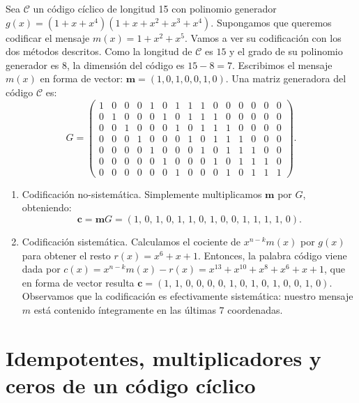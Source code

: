 \begin{example}
  Sea \(\mathcal C\) un código cíclico de longitud 15 con polinomio generador \(g(x) = (1 + x + x^4)(1 + x + x^2 + x^3 + x^4)\). Supongamos que queremos codificar el mensaje \(m(x) = 1 + x^2 + x^5\). Vamos a ver su codificación con los dos métodos descritos. Como la longitud de \(\mathcal C\) es \(15\) y el grado de su polinomio generador es \(8\), la dimensión del código es \(15 - 8 = 7\). Escribimos el mensaje \(m(x)\) en forma de vector: \(\mathbf{m}= (1, 0, 1, 0, 0, 1, 0)\). Una matriz generadora del código \(\mathcal C\) es: 
  \[
    G = \left(\begin{array}{rrrrrrrrrrrrrrr}
      1 & 0 & 0 & 0 & 1 & 0 & 1 & 1 & 1 & 0 & 0 & 0 & 0 & 0 & 0 \\
      0 & 1 & 0 & 0 & 0 & 1 & 0 & 1 & 1 & 1 & 0 & 0 & 0 & 0 & 0 \\
      0 & 0 & 1 & 0 & 0 & 0 & 1 & 0 & 1 & 1 & 1 & 0 & 0 & 0 & 0 \\
      0 & 0 & 0 & 1 & 0 & 0 & 0 & 1 & 0 & 1 & 1 & 1 & 0 & 0 & 0 \\
      0 & 0 & 0 & 0 & 1 & 0 & 0 & 0 & 1 & 0 & 1 & 1 & 1 & 0 & 0 \\
      0 & 0 & 0 & 0 & 0 & 1 & 0 & 0 & 0 & 1 & 0 & 1 & 1 & 1 & 0 \\
      0 & 0 & 0 & 0 & 0 & 0 & 1 & 0 & 0 & 0 & 1 & 0 & 1 & 1 & 1
      \end{array}\right).
  \]
  \begin{enumerate}
    \item Codificación no-sistemática. Simplemente multiplicamos \(\mathbf{m}\) por \(G\), obteniendo:
    \[
      \mathbf{c} = \mathbf{m}G = \left(1,\,0,\,1,\,0,\,1,\,1,\,0,\,1,\,0,\,0,\,1,\,1,\,1,\,1,\,0\right).
    \]
    \item Codificación sistemática. Calculamos el cociente de \(x^{n-k}m(x)\) por \(g(x)\) para obtener el resto \(r(x) = x^{6} + x + 1\). Entonces, la palabra código viene dada por \(c(x) = x^{n-k}m(x) - r(x) = x^{13} + x^{10} + x^{8} + x^{6} + x + 1\), que en forma de vector resulta \(\mathbf{c} = \left(1,\,1,\,0,\,0,\,0,\,0,\,1,\,0,\,1,\,0,\,1,\,0,\,0,\,1,\,0\right)\). Observamos que la codificación es efectivamente sistemática: nuestro mensaje \(m\) está contenido íntegramente en las últimas \(7\) coordenadas.
  \end{enumerate}
\end{example}

\section{Idempotentes, multiplicadores y ceros de un código cíclico}

